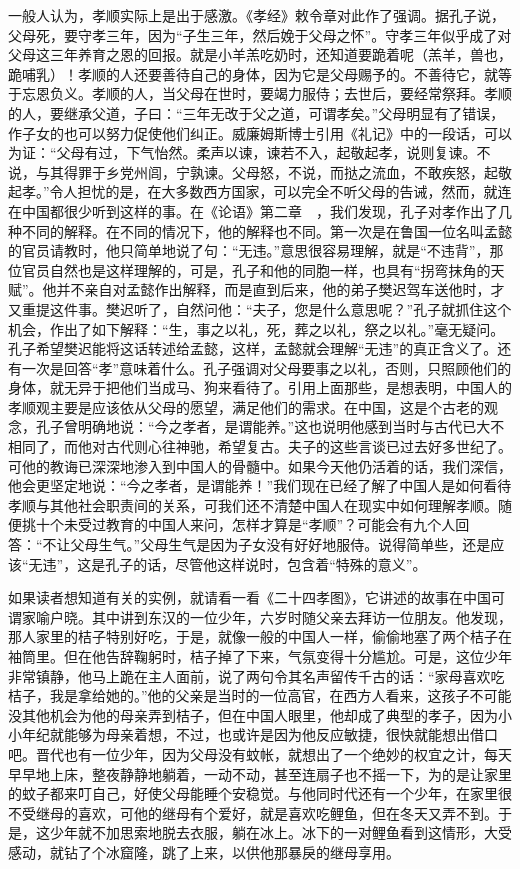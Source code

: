 \documentclass[12pt,oneside]{book}
\begin{document}
\begin{common-format}
一般人认为，孝顺实际上是出于感激。《孝经》敕令章对此作了强调。据孔子说，父母死，要守孝三年，因为“子生三年，然后娩于父母之怀”。守孝三年似乎成了对父母这三年养育之恩的回报。就是小羊羔吃奶时，还知道要跪着呢（羔羊，兽也，跪哺乳）！孝顺的人还要善待自己的身体，因为它是父母赐予的。不善待它，就等于忘恩负义。孝顺的人，当父母在世时，要竭力服侍；去世后，要经常祭拜。孝顺的人，要继承父道，子曰：“三年无改于父之道，可谓孝矣。”父母明显有了错误，作子女的也可以努力促使他们纠正。威廉姆斯博士引用《礼记》中的一段话，可以为证：“父母有过，下气怡然。柔声以谏，谏若不入，起敬起孝，说则复谏。不说，与其得罪于乡党州闾，宁孰谏。父母怒，不说，而挞之流血，不敢疾怒，起敬起孝。”令人担忧的是，在大多数西方国家，可以完全不听父母的告诫，然而，就连在中国都很少听到这样的事。在《论语》第二章　，我们发现，孔子对孝作出了几种不同的解释。在不同的情况下，他的解释也不同。第一次是在鲁国一位名叫孟懿的官员请教时，他只简单地说了句：“无违。”意思很容易理解，就是“不违背”，那位官员自然也是这样理解的，可是，孔子和他的同胞一样，也具有“拐弯抹角的天赋”。他并不亲自对孟懿作出解释，而是直到后来，他的弟子樊迟驾车送他时，才又重提这件事。樊迟听了，自然问他：“夫子，您是什么意思呢？”孔子就抓住这个机会，作出了如下解释：“生，事之以礼，死，葬之以礼，祭之以礼。”毫无疑问。孔子希望樊迟能将这话转述给孟懿，这样，孟懿就会理解“无违”的真正含义了。还有一次是回答“孝”意味着什么。孔子强调对父母要事之以礼，否则，只照顾他们的身体，就无异于把他们当成马、狗来看待了。引用上面那些，是想表明，中国人的孝顺观主要是应该依从父母的愿望，满足他们的需求。在中国，这是个古老的观念，孔子曾明确地说：“今之孝者，是谓能养。”这也说明他感到当时与古代已大不相同了，而他对古代则心往神驰，希望复古。夫子的这些言谈已过去好多世纪了。可他的教诲已深深地渗入到中国人的骨髓中。如果今天他仍活着的话，我们深信，他会更坚定地说：“今之孝者，是谓能养！”我们现在已经了解了中国人是如何看待孝顺与其他社会职责间的关系，可我们还不清楚中国人在现实中如何理解孝顺。随便挑十个未受过教育的中国人来问，怎样才算是“孝顺”？可能会有九个人回答：“不让父母生气。”父母生气是因为子女没有好好地服侍。说得简单些，还是应该“无违”，这是孔子的话，尽管他这样说时，包含着“特殊的意义”。 

如果读者想知道有关的实例，就请看一看《二十四孝图》，它讲述的故事在中国可谓家喻户晓。其中讲到东汉的一位少年，六岁时随父亲去拜访一位朋友。他发现，那人家里的桔子特别好吃，于是，就像一般的中国人一样，偷偷地塞了两个桔子在袖筒里。但在他告辞鞠躬时，桔子掉了下来，气氛变得十分尴尬。可是，这位少年非常镇静，他马上跪在主人面前，说了两句令其名声留传千古的话：“家母喜欢吃桔子，我是拿给她的。”他的父亲是当时的一位高官，在西方人看来，这孩子不可能没其他机会为他的母亲弄到桔子，但在中国人眼里，他却成了典型的孝子，因为小小年纪就能够为母亲着想，不过，也或许是因为他反应敏捷，很快就能想出借口吧。晋代也有一位少年，因为父母没有蚊帐，就想出了一个绝妙的权宜之计，每天早早地上床，整夜静静地躺着，一动不动，甚至连扇子也不摇一下，为的是让家里的蚊子都来叮自己，好使父母能睡个安稳觉。与他同时代还有一个少年，在家里很不受继母的喜欢，可他的继母有个爱好，就是喜欢吃鲤鱼，但在冬天又弄不到。于是，这少年就不加思索地脱去衣服，躺在冰上。冰下的一对鲤鱼看到这情形，大受感动，就钻了个冰窟隆，跳了上来，以供他那暴戾的继母享用。 


\end{common-format}
\end{document}

